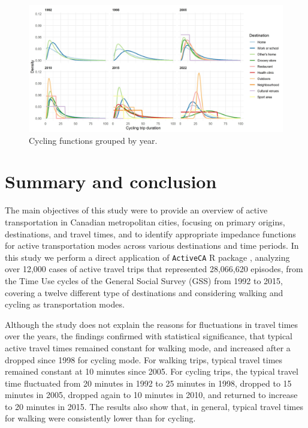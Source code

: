 \documentclass[preprint, 3p,
authoryear]{elsarticle} %
\begin{document}
\begin{figure}

{\centering \includegraphics[width=1\linewidth]{figures/cycling_functions_by_year} 

}

\caption{Cycling functions grouped by year.}\label{fig:cycling-function-by-year-fig}
\end{figure}

\section{Summary and conclusion}\label{summary-and-conclusion}

The main objectives of this study were to provide an overview of active
transportation in Canadian metropolitan cities, focusing on primary
origins, destinations, and travel times, and to identify appropriate
impedance functions for active transportation modes across various
destinations and time periods. In this study we perform a direct
application of \texttt{ActiveCA} R package
\citep{dossantos2024ActiveCA}, analyzing over 12,000 cases of active
travel trips that represented 28,066,620 episodes, from the Time Use
cycles of the General Social Survey (GSS) from 1992 to 2015, covering a
twelve different type of destinations and considering walking and
cycling as transportation modes.

Although the study does not explain the reasons for fluctuations in
travel times over the years, the findings confirmed with statistical
significance, that typical active travel times remained constant for
walking mode, and increased after a dropped since 1998 for cycling mode.
For walking trips, typical travel times remained constant at 10 minutes
since 2005. For cycling trips, the typical travel time fluctuated from
20 minutes in 1992 to 25 minutes in 1998, dropped to 15 minutes in 2005,
dropped again to 10 minutes in 2010, and returned to increase to 20
minutes in 2015. The results also show that, in general, typical travel
times for walking were consistently lower than for cycling.
\end{document}
